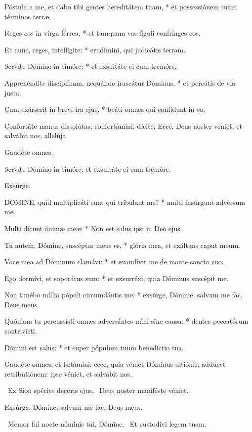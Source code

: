 Póstula a me, et dabo tibi gentes hereditátem tuam, * et possessiónem tuam términos terræ.

Reges eos in virga férrea, * et tamquam vas fíguli confrínges eos.

Et nunc, reges, intellígite: * erudímini, qui judicátis terram.

Servíte Dómino in timóre: * et exsultáte ei cum tremóre.

Apprehéndite disciplínam, nequándo irascátur Dóminus, * et pereátis de via justa.

Cum exárserit in brevi ira ejus, * beáti omnes qui confídunt in eo.

  Confortáte manus dissolútas: confortámini, dícite: Ecce, Deus noster véniet, et salvábit nos, allelúja.

 Gaudéte omnes.

  Servíte Dómino in timóre: et exsultáte ei cum tremóre.

 Exsúrge.


\lettrine[lines=2]{D}{OMINE}, quid multiplicáti sunt qui tríbulant me? * multi insúrgunt advérsum me.

Multi dicunt ánimæ meæ: * Non est salus ipsi in Deo ejus.

Tu autem, Dómine, suscéptor meus es, * glória mea, et exáltans caput meum.

Voce mea ad Dóminum clamávi: * et exaudívit me de monte sancto suo.

Ego dormívi, et soporátus sum: * et exsurréxi, quia Dóminus suscépit me.

Non timébo míllia pópuli circumdántis me: * exsúrge, Dómine, salvum me fac, Deus meus.

Quóniam tu percussísti omnes adversántes mihi sine causa: * dentes peccatórum contrivísti.

Dómini est salus: * et super pópulum tuum benedíctio tua.

  Gaudéte omnes, et lætámini: ecce, quia véniet Dóminus ultiónis, addúcet retributiónem: ipse véniet, et salvábit nos.

\V\ Ex Sion spécies decóris ejus. \R\ Deus noster maniféste véniet.

  Exsúrge, Dómine, salvum me fac, Deus meus.

\V\ Memor fui nocte nóminis tui, Dómine. \R\ Et custodívi legem tuam.

